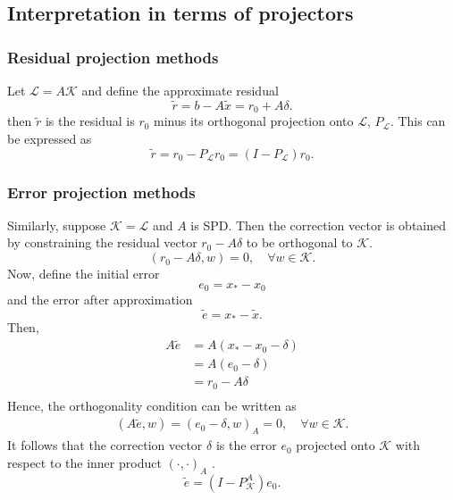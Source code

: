 \subsection{Interpretation in terms of projectors}\label{sec:projm_projectors}

\subsubsection{Residual projection methods} 
Let $\mathcal{L} = A \mathcal{K}$ and define the approximate residual
\begin{equation}
    \tilde{r} = b - A\tilde{x} = r_0 + A\delta.
    \label{eq:projm_residual}
\end{equation}
then $\tilde{r}$ is the residual is $r_0$ minus its orthogonal projection onto $\mathcal{L}$, $P_{\mathcal{L}}$. This can be expressed as \cite[Proposition 5.4]{iter_method_saad}
\begin{equation}
    \tilde{r} = r_0 - P_{\mathcal{L}}r_0 = (I - P_{\mathcal{L}})r_0.
    \label{eq:projm_residual_projection}
\end{equation}

\subsubsection{Error projection methods} 
Similarly, suppose $\mathcal{K} = \mathcal{L}$ and $A$ is SPD. Then the correction vector is obtained by constraining the residual vector $r_0 - A\delta$ to be orthogonal to $\mathcal{K}$.
\begin{equation*}
    (r_0 - A\delta, w) = 0, \quad \forall w \in \mathcal{K}.
\end{equation*}
Now, define the initial error
\begin{equation}
    e_0 = x_* - x_0
    \label{eq:projm_error_initial}
\end{equation}
and the error after approximation
\begin{equation}
    \tilde{e} = x_* - \tilde{x}.
    \label{eq:projm_error_approximation}
\end{equation}
Then,
\begin{align*}
    A\tilde{e} & = A(x_* - x_0 - \delta) \\
               & = A(e_0 - \delta)       \\
               & = r_0 - A\delta         \\
\end{align*}
Hence, the orthogonality condition can be written as
\begin{align*}
    (A\tilde{e}, w) = (e_0 - \delta, w)_{A} = 0, \quad \forall w \in \mathcal{K}.
\end{align*}
It follows that the correction vector $\delta$ is the error $e_0$ projected onto $\mathcal{K}$ with respect to the inner product $(\cdot, \cdot)_A$ \cite[Proposition 5.5]{iter_method_saad}.
\begin{equation}
    \tilde{e} = (I - P_{\mathcal{K}}^{A}) e_0.
    \label{eq:projm_error_projection}
\end{equation}

